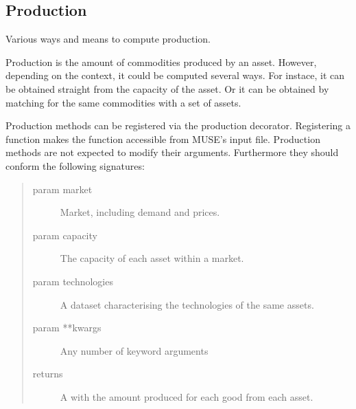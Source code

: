 \documentclass[letterpaper,10pt,english]{sphinxmanual}
\begin{document}
\subsection{Production}
\label{\detokenize{api:module-muse.production}}\label{\detokenize{api:production}}
Various ways and means to compute production.

Production is the amount of commodities produced by an asset. However, depending on the
context, it could be computed several ways. For  instace, it can be obtained straight
from the capacity of the asset. Or it can be obtained by matching for the same
commodities with a set of assets.

Production methods can be registered via the  production decorator.  Registering a function makes the function
accessible from MUSE’s input file. Production methods are not expected to modify their
arguments. Furthermore they should conform the
following signatures:

\begin{sphinxVerbatim}[commandchars=\\\{\}]
 
          
  
\end{sphinxVerbatim}
\begin{quote}\begin{description}
\item[{param market}] \leavevmode
Market, including demand and prices.

\item[{param capacity}] \leavevmode
The capacity of each asset within a market.

\item[{param technologies}] \leavevmode
A dataset characterising the technologies of the same assets.

\item[{param **kwargs}] \leavevmode
Any number of keyword arguments

\item[{returns}] \leavevmode
A  with the amount produced for each good from each asset.

\end{description}\end{quote}
\end{document}
